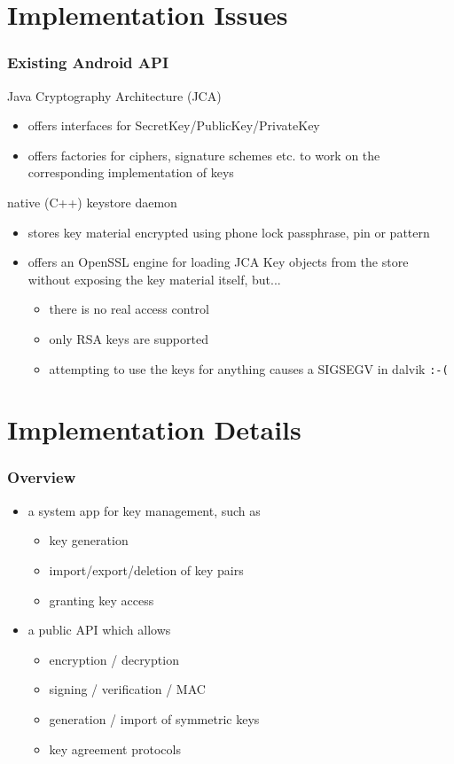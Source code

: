 \documentclass{beamer}
\begin{document}
\section{Implementation Issues}
	\begin{frame}
		\tableofcontents[currentsection]
	\end{frame}
	\begin{frame}
		\frametitle{Existing Android API}

		Java Cryptography Architecture (JCA)
		\begin{itemize}
			\item offers interfaces for SecretKey/PublicKey/PrivateKey
			\item offers factories for ciphers, signature schemes etc. to work on the corresponding implementation of keys
		\end{itemize}

		native (C++) keystore daemon
		\begin{itemize}
			\item stores key material encrypted using phone lock passphrase, pin or pattern
			\item offers an OpenSSL engine for loading JCA Key objects from the store without exposing the key material itself, but...
				\begin{itemize}
					\item there is no real access control
					\item only RSA keys are supported
					\item attempting to use the keys for anything causes a SIGSEGV in dalvik {\tt :-(}
				\end{itemize}
		\end{itemize}
	\end{frame}
\section{Implementation Details}
	\begin{frame}
		\tableofcontents[currentsection]
	\end{frame}
	\begin{frame}
		\frametitle{Overview}
		\begin{itemize}
			\item a system app for key management, such as
				\begin{itemize}
					\item key generation
					\item import/export/deletion of key pairs
					\item granting key access
				\end{itemize}
			\item a public API which allows
				\begin{itemize}
					\item encryption / decryption
					\item signing / verification / MAC
					\item generation / import of symmetric keys
					\item key agreement protocols
				\end{itemize}
		\end{itemize}
	\end{frame}
\end{document}
